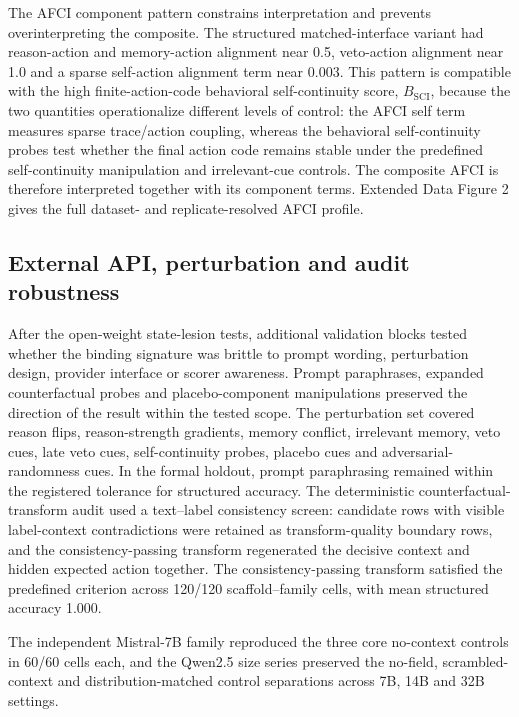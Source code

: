 ﻿\documentclass[preprint,12pt,authoryear]{elsarticle}
\begin{document}
The AFCI component pattern constrains interpretation and prevents overinterpreting the composite. The structured matched-interface variant had reason-action and memory-action alignment near 0.5, veto-action alignment near 1.0 and a sparse self-action alignment term near 0.003. This pattern is compatible with the high finite-action-code behavioral self-continuity score, \(B_{\mathrm{SCI}}\), because the two quantities operationalize different levels of control: the AFCI self term measures sparse trace/action coupling, whereas the behavioral self-continuity probes test whether the final action code remains stable under the predefined self-continuity manipulation and irrelevant-cue controls. The composite AFCI is therefore interpreted together with its component terms. Extended Data Figure 2 gives the full dataset- and replicate-resolved AFCI profile.
\FloatBarrier

\subsection{External API, perturbation and audit robustness}

After the open-weight state-lesion tests, additional validation blocks tested whether the binding signature was brittle to prompt wording, perturbation design, provider interface or scorer awareness. Prompt paraphrases, expanded counterfactual probes and placebo-component manipulations preserved the direction of the result within the tested scope. The perturbation set covered reason flips, reason-strength gradients, memory conflict, irrelevant memory, veto cues, late veto cues, self-continuity probes, placebo cues and adversarial-randomness cues. In the formal holdout, prompt paraphrasing remained within the registered tolerance for structured accuracy. The deterministic counterfactual-transform audit used a text--label consistency screen: candidate rows with visible label-context contradictions were retained as transform-quality boundary rows, and the consistency-passing transform regenerated the decisive context and hidden expected action together. The consistency-passing transform satisfied the predefined criterion across 120/120 scaffold--family cells, with mean structured accuracy 1.000.

The independent Mistral-7B family reproduced the three core no-context controls in 60/60 cells each, and the Qwen2.5 size series preserved the no-field, scrambled-context and distribution-matched control separations across 7B, 14B and 32B settings.
\end{document}
